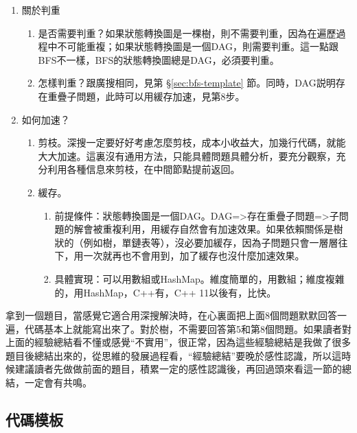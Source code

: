 \begin{enumerate}
{為了判斷是否到了收斂條件，要在函數接口裏用一個參數記錄當前的位置（或距離目標還有多遠）。如果是求一個解，直接返回這個解；如果是求所有解，要在這裏收集解，即把第一步中表示路徑的數組複製到解集合裏。}

\item 關於判重
    \begin{enumerate}
    \item 是否需要判重？如果狀態轉換圖是一棵樹，則不需要判重，因為在遍歷過程中不可能重複；如果狀態轉換圖是一個DAG，則需要判重。這一點跟BFS不一樣，BFS的狀態轉換圖總是DAG，必須要判重。
    \item 怎樣判重？跟廣搜相同，見第 \S \ref{sec:bfs-template} 節。同時，DAG説明存在重疊子問題，此時可以用緩存加速，見第8步。
    \end{enumerate}

\item 如何加速？
    \begin{enumerate}
    \item 剪枝。深搜一定要好好考慮怎麼剪枝，成本小收益大，加幾行代碼，就能大大加速。這裏沒有通用方法，只能具體問題具體分析，要充分觀察，充分利用各種信息來剪枝，在中間節點提前返回。
    \item 緩存。
        \begin{enumerate}
            \item 前提條件：狀態轉換圖是一個DAG。DAG=>存在重疊子問題=>子問題的解會被重複利用，用緩存自然會有加速效果。如果依賴關係是樹狀的（例如樹，單鏈表等），沒必要加緩存，因為子問題只會一層層往下，用一次就再也不會用到，加了緩存也沒什麼加速效果。
            \item 具體實現：可以用數組或HashMap。維度簡單的，用數組；維度複雜的，用HashMap，C++有，C++ 11以後有，比快。
        \end{enumerate}
    
    \end{enumerate}
\end{enumerate}

拿到一個題目，當感覺它適合用深搜解決時，在心裏面把上面8個問題默默回答一遍，代碼基本上就能寫出來了。對於樹，不需要回答第5和第8個問題。如果讀者對上面的經驗總結看不懂或感覺“不實用”，很正常，因為這些經驗總結是我做了很多題目後總結出來的，從思維的發展過程看，“經驗總結”要晚於感性認識，所以這時候建議讀者先做做前面的題目，積累一定的感性認識後，再回過頭來看這一節的總結，一定會有共鳴。


\subsection{代碼模板}

